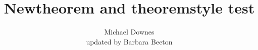 



\documentclass{article}
\title{Newtheorem and theoremstyle test}
\author{Michael Downes\\updated by Barbara Beeton}

